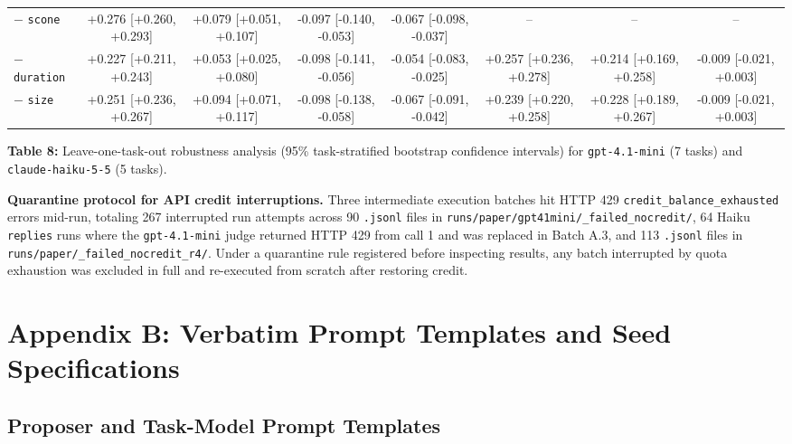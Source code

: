 \documentclass[10pt]{article}
\begin{document}
\begin{center}
{\begin{tabular}{@{}lccccccc@{}}
\(-\) \texttt{scone} & +0.276 {[}+0.260, +0.293{]} & +0.079 {[}+0.051, +0.107{]} & -0.097 {[}-0.140, -0.053{]} & -0.067 {[}-0.098, -0.037{]} & -- & -- & -- \\
\(-\) \texttt{duration} & +0.227 {[}+0.211, +0.243{]} & +0.053 {[}+0.025, +0.080{]} & -0.098 {[}-0.141, -0.056{]} & -0.054 {[}-0.083, -0.025{]} & +0.257 {[}+0.236, +0.278{]} & +0.214 {[}+0.169, +0.258{]} & -0.009 {[}-0.021, +0.003{]} \\
\(-\) \texttt{size} & +0.251 {[}+0.236, +0.267{]} & +0.094 {[}+0.071, +0.117{]} & -0.098 {[}-0.138, -0.058{]} & -0.067 {[}-0.091, -0.042{]} & +0.239 {[}+0.220, +0.258{]} & +0.228 {[}+0.189, +0.267{]} & -0.009 {[}-0.021, +0.003{]} \\
\bottomrule
\end{tabular}%
}
\end{center}

\textbf{Table 8:} Leave-one-task-out robustness analysis (95\%
task-stratified bootstrap confidence intervals) for
\texttt{gpt-4.1-mini} (7 tasks) and \texttt{claude-haiku-5-5} (5 tasks).

\textbf{Quarantine protocol for API credit interruptions.} Three
intermediate execution batches hit HTTP 429
\texttt{credit\_balance\_exhausted} errors mid-run, totaling 267
interrupted run attempts across 90 \texttt{.jsonl} files in
\texttt{runs/paper/gpt41mini/\_failed\_nocredit/}, 64 Haiku
\texttt{replies} runs where the \texttt{gpt-4.1-mini} judge returned
HTTP 429 from call 1 and was replaced in Batch A.3, and 113
\texttt{.jsonl} files in \texttt{runs/paper/\_failed\_nocredit\_r4/}.
Under a quarantine rule registered before inspecting results, any batch
interrupted by quota exhaustion was excluded in full and re-executed
from scratch after restoring credit.

\hypertarget{appendix-b-verbatim-prompt-templates-and-seed-specifications}{%
\section{Appendix B: Verbatim Prompt Templates and Seed
Specifications}\label{appendix-b-verbatim-prompt-templates-and-seed-specifications}}

\hypertarget{proposer-and-task-model-prompt-templates}{%
\subsection{Proposer and Task-Model Prompt
Templates}\label{proposer-and-task-model-prompt-templates}}
\end{document}
